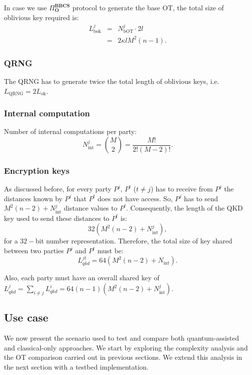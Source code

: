 In case we use $\Pi^{\textbf{BBCS}}_{\textbf{O}}$ protocol to generate the base OT, the total size of oblivious key required is:
\begin{eqnarray*}
L^j_{\text{bok}} &=& N_{\text{bOT}}^j \cdot 2l \\
&=& 2\kappa lM^2(n-1).
\end{eqnarray*}


\subsubsection{QRNG}
The QRNG has to generate twice the total length of oblivious keys, i.e. $L_{\text{QRNG}} = 2L_\text{ok}$.

\subsubsection{Internal computation}
Number of internal computations per party:
$$N_\text{int}^j = \binom{M}{2} = \frac{M!}{2!(M-2)!}.$$

\subsubsection{Encryption keys}
As discussed before, for every party $P^j$, $P^t$ ($t\neq j$) has to receive from $P^j$ the distances known by $P^j$ that $P^t$ does not have access. So, $P^j$ has to send $M^2(n-2) + N_\text{int}^j$ distance values to $P^t$. Consequently, the length of the QKD key used to send these distances to $P^t$ is:
$$32(M^2(n-2) + N^j_\text{int}),$$
for a $32-$bit number representation. Therefore, the total size of key shared between two parties $P^j$ and $P^t$ must be:
$$L^{jt}_{qkd} = 64(M^2(n-2) + N_\text{int}).$$

Also, each party must have an overall shared key of $L^{j}_{qkd} = \sum_{i\neq j} L^{i}_{qkd} = 64(n-1)(M^2(n-2) + N^j_\text{int})$.



\subsection{Use case}\label{useCase}

We now present the scenario used to test and compare both quantum-assisted and classical-only approaches. We start by exploring the complexity analysis and the OT comparison carried out in previous sections. We extend this analysis in the next section with a testbed implementation. 

